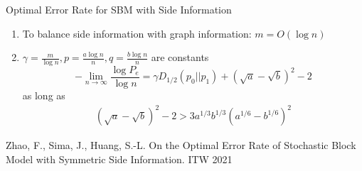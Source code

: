 \documentclass[notheorems]{beamer}
\DeclareMathOperator{\Bern}{Bern}
\begin{document}
\begin{frame}{Optimal Error Rate for SBM with Side Information}
\begin{enumerate}
	\item To balance side information with graph information:  $ m = O(\log n)$
	\item $\gamma=\frac{m}{ \log n},
	p=\frac{a \log n}{n}, q=\frac{b \log n}{n}$ are constants
		\begin{equation*}\label{eq:PeMainL}
		-\lim_{n\to \infty}\frac{\log P_e}{\log n}=\gamma D_{1/2}(p_0||p_1) + (\sqrt{a} - \sqrt{b})^2-2
		\end{equation*}
		as long as
		\begin{align*}
			(\sqrt{a}-\sqrt{b})^2-2 
			> 3a^{1/3}b^{1/3}(a^{1/6}-b^{1/6})^2\label{eq:oneC}
		\end{align*}	
\end{enumerate}
Zhao, F., Sima, J., Huang, S.-L. On the Optimal Error Rate of Stochastic Block Model with Symmetric Side Information.
ITW 2021
\end{frame}
\end{document}
